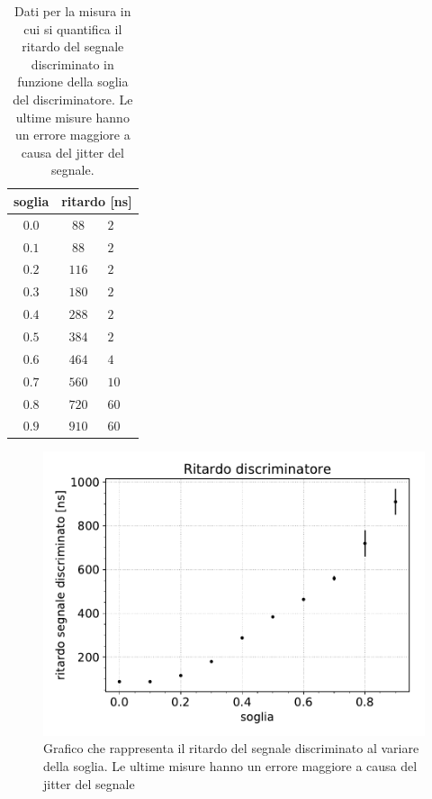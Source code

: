 \begin{table}[h]
\centering

\begin{tabular}{c|c @{\,$\pm$\,} l}
soglia & \multicolumn{2}{c}{ritardo [\si{ns}]} \\
\hline
$ 0.0 $ & $ 88 $ & $ 2 $\\ 
$ 0.1 $ & $ 88 $ & $ 2 $\\ 
$ 0.2 $ & $ 116 $ & $ 2 $\\ 
$ 0.3 $ & $ 180 $ & $ 2 $\\ 
$ 0.4 $ & $ 288 $ & $ 2 $\\ 
$ 0.5 $ & $ 384 $ & $ 2 $\\ 
$ 0.6 $ & $ 464 $ & $ 4 $\\ 
$ 0.7 $ & $ 560 $ & $ 10 $\\ 
$ 0.8 $ & $ 720 $ & $ 60 $\\ 
$ 0.9 $ & $ 910 $ & $ 60 $\\ 
\end{tabular}

\caption{Dati per la misura in cui si quantifica il ritardo del segnale discriminato in funzione della soglia del discriminatore.
Le ultime misure hanno un errore maggiore a causa del jitter del segnale.}
\label{tab:rit}
\end{table}

\begin{figure}[h]
\centering
\includegraphics[width=30 em]{immagini/ritardo}
\caption{Grafico che rappresenta il ritardo del segnale discriminato al variare della soglia. Le ultime misure hanno un errore maggiore a causa del jitter del segnale}
\label{fig:rit}
\end{figure}

